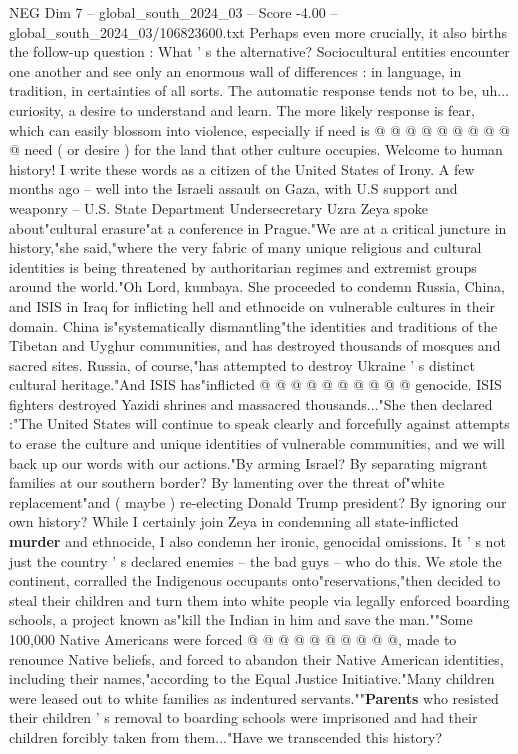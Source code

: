 \begin{textsample}{NEG Dim 7 – global\_south\_2024\_03 – Score -4.00 – global\_south\_2024\_03/106823600.txt}
Perhaps even more crucially, it also births the follow-up question : What ' s the alternative?
Sociocultural entities encounter one another and see only an enormous wall of differences : in language, in tradition, in certainties of all sorts.
The automatic response tends not to be, uh... curiosity, a desire to understand and learn.
The more likely response is fear, which can easily blossom into violence, especially if need is @ @ @ @ @ @ @ @ @ @ need ( or desire ) for the land that other culture occupies.
Welcome to human history!
I write these words as a citizen of the United States of Irony.
A few months ago -- well into the Israeli assault on Gaza, with U.S support and weaponry -- U.S.
State Department Undersecretary Uzra Zeya spoke about"cultural erasure"at a conference in Prague."We are at a critical juncture in history,"she said,"where the very fabric of many unique religious and cultural identities is being threatened by authoritarian regimes and extremist groups around the world."Oh Lord, kumbaya.
She proceeded to condemn Russia, China, and ISIS in Iraq for inflicting hell and ethnocide on vulnerable cultures in their domain.
China is"systematically dismantling"the identities and traditions of the Tibetan and Uyghur communities, and has destroyed thousands of mosques and sacred sites.
Russia, of course,"has attempted to destroy Ukraine ' s distinct cultural heritage."And ISIS has"inflicted @ @ @ @ @ @ @ @ @ @ genocide.
ISIS fighters destroyed Yazidi shrines and massacred thousands..."She then declared :"The United States will continue to speak clearly and forcefully against attempts to erase the culture and unique identities of vulnerable communities, and we will back up our words with our actions."By arming Israel?
By separating migrant families at our southern border?
By lamenting over the threat of"white replacement"and ( maybe ) re-electing Donald Trump president?
By ignoring our own history?
While I certainly join Zeya in condemning all state-inflicted \textbf{murder} and ethnocide, I also condemn her ironic, genocidal omissions.
It ' s not just the country ' s declared enemies -- the bad guys -- who do this.
We stole the continent, corralled the Indigenous occupants onto"reservations,"then decided to steal their children and turn them into white people via legally enforced boarding schools, a project known as"kill the Indian in him and save the man.""Some 100,000 Native Americans were forced @ @ @ @ @ @ @ @ @ @, made to renounce Native beliefs, and forced to abandon their Native American identities, including their names,"according to the Equal Justice Initiative."Many children were leased out to white families as indentured servants.""\textbf{Parents} who resisted their children ' s removal to boarding schools were imprisoned and had their children forcibly taken from them..."Have we transcended this history?

\end{textsample}
